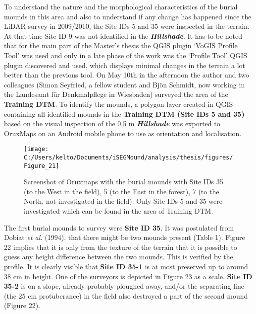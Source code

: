 \documentclass[
  12pt,
]{article}
\begin{document}
To understand the nature and the morphological characteristics of the burial mounds in this area and also to understand if any change has happened since the LiDAR survey in 2009/2010, the Site IDs 5 and 35 were inspected in the terrain. At that time Site ID 9 was not identified in the \textbf{\emph{Hillshade}}. It has to be noted that for the main part of the Master's thesis the QGIS plugin `VoGIS Profile Tool' was used and only in a late phase of the work was the `Profile Tool' QGIS plugin discovered and used, which displays minimal changes in the terrain a lot better than the previous tool.
On May 10th in the afternoon the author and two colleagues (Simon Seyfried, a fellow student and Bjön Schmidt, now working in the Landesamt für Denkmalpflege in Wiesbaden) surveyed the area of the \textbf{Training DTM}. To identify the mounds, a polygon layer created in QGIS containing all identified mounds in the \textbf{Training DTM (Site IDs 5 and 35)} based on the visual inspection of the 0.5 m \textbf{\emph{Hillshade}} was exported to OruxMaps on an Android mobile phone to use as orientation and localisation.

\begin{figure}

{\centering \texttt{[image: C:/Users/kelto/Documents/iSEGMound/analysis/thesis/figures/Figure\_21]} 

}

\caption{Screenshot of Oruxmaps with the burial mounds with Site IDs 35 (to the West in the field), 5 (to the East in the forest), 7 (to the North, not investigated in the field). Only Site IDs 5 and 35 were investigated which can be found in the area of Training DTM.}\label{fig:Figure21}
\end{figure}

The first burial mounds to survey were \textbf{Site ID 35}. It was postulated from Dobiat \emph{et al.} (1994), that there might be two mounds present (Table 1). Figure 22 implies that it is only from the texture of the terrain that it is possible to guess any height difference between the two mounds. This is verified by the profile. It is clearly visible that \textbf{Site ID 35-1} is at most preserved up to around 38 cm in height. One of the surveyors is depicted in Figure 23 as a scale. \textbf{Site ID 35-2} is on a slope, already probably ploughed away, and/or the separating line (the 25 cm protuberance) in the field also destroyed a part of the second mound (Figure 22).
\end{document}
